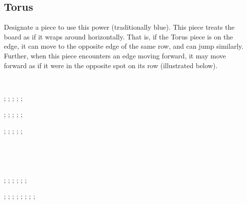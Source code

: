 \documentclass{article}
\begin{document}
\subsection*{Torus}
Designate a piece to use this power (traditionally blue).
This piece treats the board as if it wraps around horizontally.
That is, if the Torus piece is on the edge, it can move to the opposite edge of the same row, and can jump similarly.
Further, when this piece encounters an edge moving forward, it may move forward as if it were in the opposite spot on its row (illustrated below).

\

\begin{center}
\begin{struggleboard}{0.5}
  ;
  ;
  ;
  ;
  ;
\end{struggleboard}
\begin{struggleboard}{0.5}
  ;
  ;
  ;
  ;
  ;
\end{struggleboard}
\begin{struggleboard}{0.5}
  ;
  ;
  ;
  ;
  ;
\end{struggleboard}

\

\

\begin{struggleboard}{0.5}
  ;
  ;
  ;
  ;
  ;
  ;
\end{struggleboard}
\quad
\begin{struggleboard}{0.5}
  ;
  ;
  ;
  ;
  ;
  ;
  ;
  ;
\end{struggleboard}
\end{center}
\end{document}
